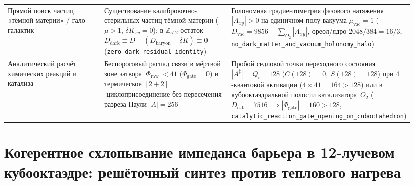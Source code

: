 \begin{table}[htbp]
\begin{tabular}{@{}p{0.28\linewidth}p{0.33\linewidth}p{0.33\linewidth}@{}}
\addlinespace
Прямой поиск частиц «тёмной материи» / гало галактик & Существование калибровочно-стерильных частиц тёмной материи ($\mu>1$, $\delta K_{xy}=0$): в $\mathbb{Z}_{512}$ остаток $D_{\mathrm{dark}} \equiv D - (D_{\mathrm{baryon}}-\delta K) \equiv 0$ (\texttt{zero\_\allowbreak dark\_\allowbreak residual\_\allowbreak identity}) & Голономная градиентометрия фазового натяжения $|A_{xy}|>0$ на единичном полу вакуума $\mu_{\mathrm{vac}}=1$ ($D_{\mathrm{vac}} = 9856 - \sum_{O_2}|A_{xy}|$, ореол/ядро $2048/384 = 16/3$, \texttt{no\_\allowbreak dark\_\allowbreak matter\_\allowbreak and\_\allowbreak vacuum\_\allowbreak holonomy\_\allowbreak halo}) \\
\addlinespace
Аналитический расчёт химических реакций и катализа & Беспороговый распад связи в мёртвой зоне затвора $|\Phi_{\mathrm{raw}}|<41$ ($\Phi_{\mathrm{gate}}=0$) и термическое $[2+2]$-циклоприсоединение без пересечения разреза Паули $|A|=256$ & Пробой седловой точки переходного состояния $|A^\ddagger|=Q_\square=128$ ($C(128)=0,\ S(128)=128$) при $4$-квантовой активации ($4\times 41=164>128$) или в кубооктаэдральной полости катализатора~$O_2$ ($D_{\mathrm{cat}}=7516\implies |\Phi_{\mathrm{gate}}|=160>128$, \texttt{catalytic\_\allowbreak reaction\_\allowbreak gate\_\allowbreak opening\_\allowbreak on\_\allowbreak cuboctahedron}) \\
\bottomrule
\end{tabular}
\end{table}

\chapter{Когерентное схлопывание импеданса барьера в 12-лучевом кубооктаэдре: решёточный синтез против теплового нагрева}
\label{ch:applied-coherent-barrier-collapse}

